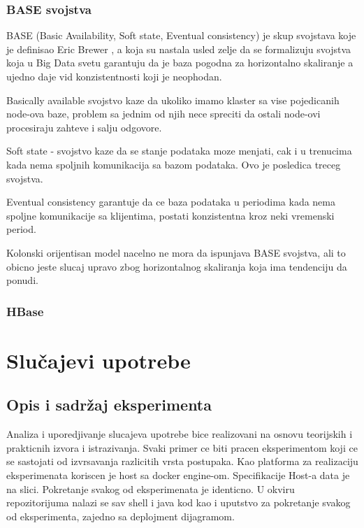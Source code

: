\documentclass[12pt,oneside]{memoir}
\begin{document}
\subsection{BASE svojstva}
BASE (Basic Availability, Soft state, Eventual consistency) je skup svojstava koje je definisao Eric Brewer , a koja su nastala usled zelje da se formalizuju svojstva koja u Big Data svetu garantuju da je baza pogodna za horizontalno skaliranje a ujedno daje vid konzistentnosti koji je neophodan. 

Basically available  svojstvo kaze da ukoliko imamo klaster sa vise pojedicanih node-ova baze, problem sa jednim od njih nece spreciti da ostali node-ovi procesiraju zahteve i salju odgovore.

Soft state -  svojstvo kaze da se stanje podataka moze menjati, cak i u trenucima kada nema spoljnih komunikacija sa bazom podataka. Ovo je posledica treceg svojstva.

Eventual consistency garantuje da ce baza podataka u periodima kada nema spoljne komunikacije sa klijentima, postati konzistentna kroz neki vremenski period. 

Kolonski orijentisan model nacelno ne mora da ispunjava BASE svojstva, ali to obicno jeste slucaj upravo zbog horizontalnog skaliranja koja ima tendenciju da ponudi.
\pagebreak

\subsection{HBase}


\chapter{Slučajevi upotrebe}
\section{Opis i sadržaj eksperimenta}
Analiza i uporedjivanje slucajeva upotrebe bice realizovani na osnovu teorijskih i prakticnih  izvora i istrazivanja. Svaki primer ce biti pracen eksperimentom koji ce se sastojati od izvrsavanja razlicitih vrsta postupaka. Kao platforma za realizaciju eksperimenata koriscen je host sa docker engine-om. Specifikacije Host-a data je na slici. Pokretanje svakog od eksperimenata je identicno. U okviru repozitorijuma nalazi se sav shell i java kod kao i uputstvo za pokretanje svakog od eksperimenta, zajedno sa deplojment dijagramom.
\end{document}
